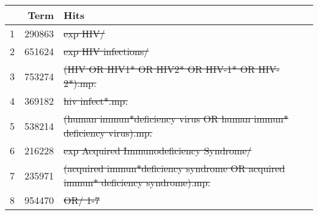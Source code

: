 \searchsize
\begin{tabular}{rrl}
	\toprule
	  &         Term & Hits                                                                                 \\
	\midrule
	1 & \num{290863} & \st{exp HIV/}                                                                        \\
	2 & \num{651624} & \st{exp HIV infections/}                                                             \\
	3 & \num{753274} & \st{(HIV OR HIV1* OR HIV2* OR HIV-1* OR HIV-2*).mp.}                                 \\
	4 & \num{369182} & \st{hiv infect*.mp.}                                                                 \\
	5 & \num{538214} & \st{(human immun*deficiency virus OR human immun* deficiency virus).mp.}             \\
	6 & \num{216228} & \st{exp Acquired Immunodeficiency Syndrome/}                                         \\
	7 & \num{235971} & \st{(acquired immun*deficiency syndrome OR acquired immun* deficiency syndrome).mp.} \\
	8 & \num{954470} & \st{OR/ 1-7}                                                                         \\
	\bottomrule
\end{tabular}
